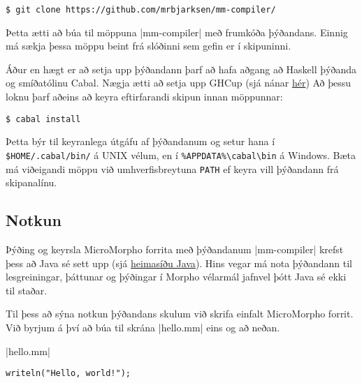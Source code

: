 \documentclass[12pt]{article}
\begin{document}
\begin{mdframed}[style=langframe]
\begin{Verbatim}
$ git clone https://github.com/mrbjarksen/mm-compiler/
\end{Verbatim}
\end{mdframed}

Þetta ætti að búa til möppuna |mm-compiler| með frumkóða þýðandans.
Einnig má sækja þessa möppu beint frá slóðinni sem gefin er í skipuninni.

Áður en hægt er að setja upp þýðandann þarf að hafa aðgang að Haskell þýðanda
og smíðatólinu Cabal. Nægja ætti að setja upp GHCup
(sjá nánar \href{https://www.haskell.org/ghcup/install/}{hér})
Að þessu loknu þarf aðeins að keyra eftirfarandi skipun innan möppunnar:

\begin{mdframed}[style=langframe]
\begin{Verbatim}
$ cabal install
\end{Verbatim}
\end{mdframed}

Þetta býr til keyranlega útgáfu af þýðandanum
og setur hana í \verb|$HOME/.cabal/bin/| á UNIX vélum,
en í \verb|%APPDATA%\cabal\bin| á Windows.
Bæta má viðeigandi möppu við umhverfisbreytuna \verb|PATH|
ef keyra vill þýðandann frá skipanalínu.

\subsection{Notkun}
Þýðing og keyrsla MicroMorpho forrita með þýðandanum |mm-compiler|
krefst þess að Java sé sett upp (sjá \href{https://www.java.com/en/}{heimasíðu Java}).
Hins vegar má nota þýðandann til lesgreiningar, þáttunar
og þýðingar í Morpho vélarmál jafnvel þótt Java sé ekki til staðar.

Til þess að sýna notkun þýðandans skulum við skrifa einfalt
MicroMorpho forrit.
Við byrjum á því að búa til skrána |hello.mm| eins og að neðan.
\medskip

\colorbox{gray!75}{\hspace*{9pt}|hello.mm|\hspace{9pt}}\vspace{-10pt}\par%
\begin{mdframed}[style=langframe,topline=true]
\begin{Verbatim}
writeln("Hello, world!");
\end{Verbatim}
\end{mdframed}
\end{document}
